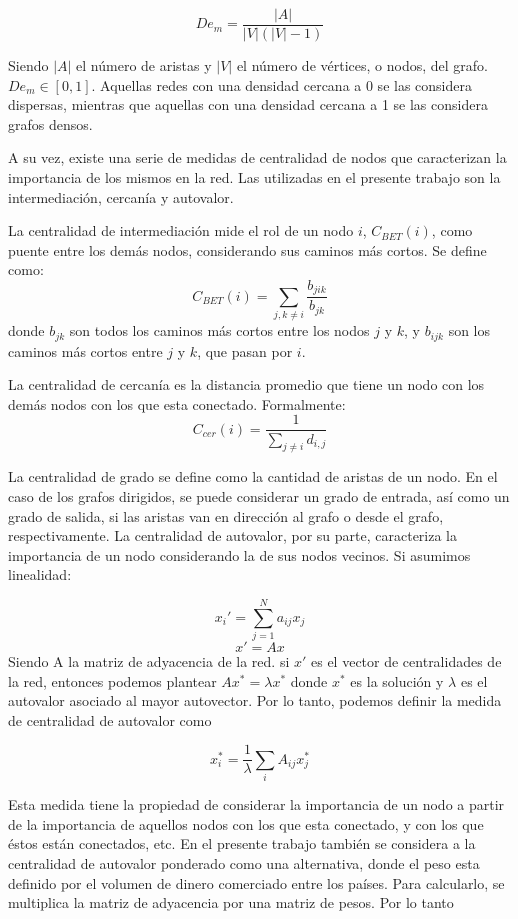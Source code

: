 \documentclass[class=article, crop=false]{standalone}
\begin{document}
$$
De_m = \frac{|A|}{|V|(|V|-1)}
$$

Siendo $|A|$ el número de aristas y $|V|$ el número de vértices, o nodos, del grafo. $De_m \in [0,1]$. Aquellas redes con una densidad cercana a 0 se las considera dispersas, mientras que aquellas con una densidad cercana a 1 se las considera grafos densos. \par

A su vez, existe una serie de medidas de centralidad de nodos que caracterizan la importancia de los mismos en la red. Las utilizadas en el presente trabajo son la intermediación, cercanía y autovalor. \par
La centralidad de intermediación mide el rol de un nodo $i$, $C_{BET}(i)$, como puente entre los demás nodos, considerando sus caminos más cortos. Se define como:
$$
C_{BET}(i) = \sum_{j,k \neq i} \frac{b_{jik}}{b_{jk}}
$$
donde $b_{jk}$ son todos los caminos más cortos entre los nodos $j$ y $k$, y $b_{ijk}$ son los caminos más cortos entre $j$ y $k$, que pasan por $i$. \par
La centralidad de cercanía es la distancia promedio que tiene un nodo con los demás nodos con los que esta conectado. Formalmente: 
$$
C_{cer}(i) = \frac{1}{\displaystyle \sum_{j \neq i} d_{i,j} }
$$

La centralidad de grado se define como la cantidad de aristas de un nodo. En el caso de los grafos dirigidos, se puede considerar un grado de entrada, así como un grado de salida, si las aristas van en dirección al grafo o desde el grafo, respectivamente.
La centralidad de autovalor, por su parte, caracteriza la importancia de un nodo considerando la de sus nodos vecinos. Si asumimos linealidad:

$$
x_i'= \sum_{j=1}^{N} a_{ij}x_{j}
$$
$$
x' = Ax
$$
Siendo A la matriz de adyacencia de la red. si $x'$ es el vector de centralidades de la red, entonces podemos plantear $Ax^* = \lambda x^*$ donde $x^*$ es la solución y  $\lambda$ es el autovalor asociado al mayor autovector.  Por lo tanto, podemos definir la medida de centralidad de autovalor como

$$
x_i^*=\frac{1}{\lambda}  \sum_{i} A_{ij}x_{j}^*
$$

Esta medida tiene la propiedad de considerar la importancia de un nodo a partir de la importancia de aquellos nodos con los que esta conectado, y con los que éstos están conectados, etc. En el presente trabajo también se considera a la centralidad de autovalor ponderado como una alternativa, donde el peso esta definido por el volumen de dinero comerciado entre los países. Para calcularlo, se multiplica la matriz de adyacencia por una matriz de pesos. Por lo tanto
\end{document}
